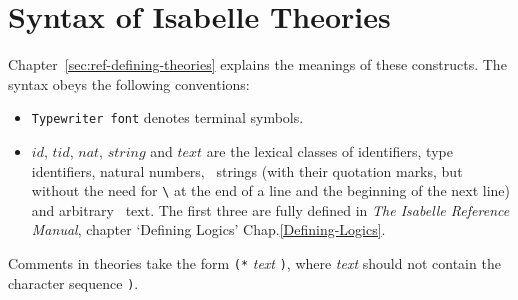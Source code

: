 
\appendix
{}  %

\chapter{Syntax of Isabelle Theories}\label{app:TheorySyntax}
Chapter~\ref{sec:ref-defining-theories} explains the meanings of these
constructs.  The syntax obeys the following conventions:
\begin{itemize}
\item {\tt Typewriter font} denotes terminal symbols.
\item $id$, $tid$, $nat$, $string$ and $text$ are the lexical classes of
  identifiers, type identifiers, natural numbers, \ML\ strings (with their
  quotation marks, but without the need for \verb$\$ at the end of a line and
  the beginning of the next line) and arbitrary \ML\ text.  The first three
  are fully defined in %
    {{\it The Isabelle Reference Manual}, chapter `Defining Logics'}%
    {Chap.\ts\ref{Defining-Logics}}.
\end{itemize}
Comments in theories take the form {\tt (*} {\it text\/} {\tt*)}, where
{\it text\/} should not contain the character sequence {\tt*)}.

